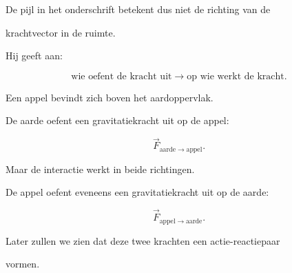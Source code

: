 \documentclass{ximera}
\begin{document}
De pijl in het onderschrift betekent dus niet de richting van de

krachtvector in de ruimte.

Hij geeft aan:

\[\boxed{ \text{wie oefent de kracht uit} \rightarrow \text{op wie werkt de kracht}. }\]


\begin{voorbeeld}

Een appel bevindt zich boven het aardoppervlak.

De aarde oefent een gravitatiekracht uit op de appel:

\[\vec F_{\mathrm{aarde}\rightarrow\mathrm{appel}}.\]

Maar de interactie werkt in beide richtingen.

De appel oefent eveneens een gravitatiekracht uit op de aarde:

\[\vec F_{\mathrm{appel}\rightarrow\mathrm{aarde}}.\]

Later zullen we zien dat deze twee krachten een actie-reactiepaar

vormen.

\end{voorbeeld}
\end{document}
